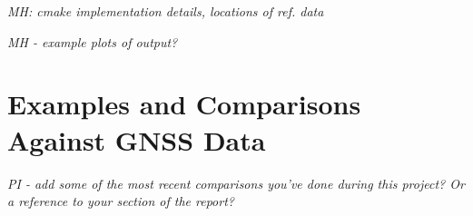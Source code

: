 \documentclass[11pt,letterpaper]{article}
\begin{document}
\emph{MH:  cmake implementation details, locations of ref. data}

\emph{MH - example plots of output?}



\section{Examples and Comparisons Against GNSS Data}

\emph{PI - add some of the most recent comparisons you've done during this project?  Or a reference to your section of the report?}



\pagebreak
\setcounter{page}{1}


\end{document}
